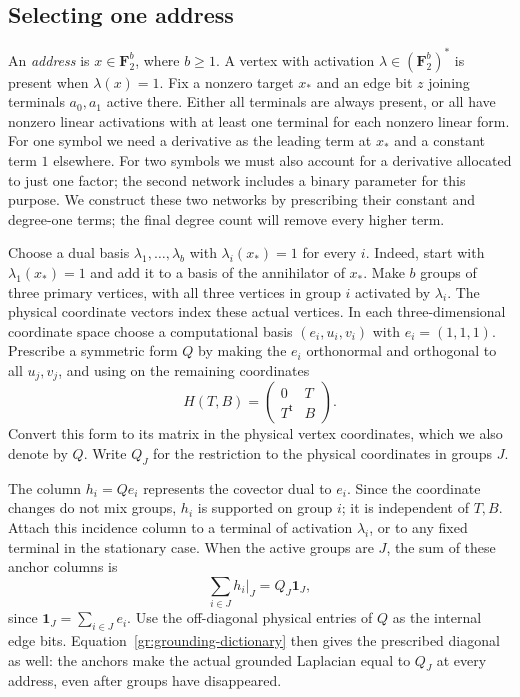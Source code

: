 \subsection{Selecting one address}

An \emph{address} is $x\in\mathbf F_2^b$, where $b\ge1$.
A vertex with activation $\lambda\in(\mathbf F_2^b)^*$ is present
when $\lambda(x)=1$.  Fix a nonzero target $x_*$ and an edge bit $z$
joining terminals $a_0,a_1$ active there.  Either all terminals are always
present, or all have nonzero linear activations with at least one terminal
for each nonzero linear form.  For one symbol we need a derivative as the leading term at $x_*$ and
a constant term $1$ elsewhere. For two symbols we must also account for
a derivative allocated to just one factor; the second network includes
a binary parameter for this purpose. We construct these two networks by
prescribing their constant and degree-one terms; the final degree count
will remove every higher term.

Choose a dual basis $\lambda_1,\ldots,\lambda_b$ with
$\lambda_i(x_*)=1$ for every $i$.  Indeed, start with
$\lambda_1(x_*)=1$ and add it to a basis of the annihilator of $x_*$.
Make $b$ groups of three primary vertices, with all three vertices in
group $i$ activated by $\lambda_i$. The physical coordinate vectors index
these actual vertices. In each three-dimensional coordinate space choose
a computational basis $(e_i,u_i,v_i)$ with $e_i=(1,1,1)$. Prescribe a
symmetric form $Q$ by making the $e_i$ orthonormal and orthogonal to all
$u_j,v_j$, and using on the remaining coordinates
\begin{equation}\label{gr:H}
 H(T,B)=\begin{pmatrix}0&T\\T^{\mathsf t}&B\end{pmatrix}.
\end{equation}
Convert this form to its matrix in the physical vertex coordinates,
which we also denote by $Q$. Write $Q_J$ for the restriction to the
physical coordinates in groups $J$.

The column $h_i=Qe_i$ represents the covector dual to $e_i$. Since the
coordinate changes do not mix groups, $h_i$ is supported on group $i$;
it is independent of $T,B$. Attach this incidence column to a terminal
of activation $\lambda_i$, or to any fixed terminal in the stationary
case. When the active groups are $J$, the sum of these anchor columns is
\[
             \sum_{i\in J}h_i|_J=Q_J\mathbf1_J,
\]
since $\mathbf1_J=\sum_{i\in J}e_i$. Use the off-diagonal physical
entries of $Q$ as the internal edge bits. Equation~\eqref{gr:grounding-dictionary}
then gives the prescribed diagonal as well: the anchors make the actual
grounded Laplacian equal to $Q_J$ at every address, even after groups
have disappeared.

